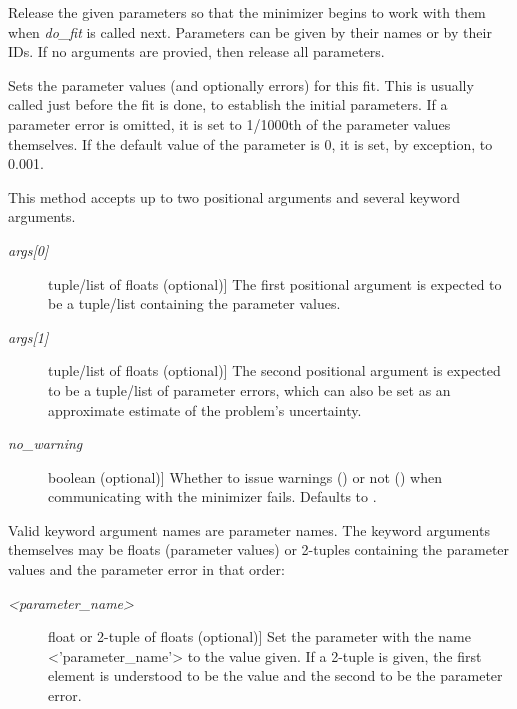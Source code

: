 \documentclass[a4paper,10pt,english]{sphinxmanual}
\begin{document}
\begin{fulllineitems}

\begin{fulllineitems}
\label{index:kafe.fit.Fit.release_parameters}
Release the given parameters so that the minimizer begins to work with
them when \emph{do\_fit} is called next. Parameters can be given by their
names or by their IDs. If no arguments are provied, then release all
parameters.

\end{fulllineitems}


\begin{fulllineitems}
\label{index:kafe.fit.Fit.set_parameters}
Sets the parameter values (and optionally errors) for this fit.
This is usually called just before the fit is done, to establish
the initial parameters. If a parameter error is omitted, it is
set to 1/1000th of the parameter values themselves. If the default
value of the parameter is 0, it is set, by exception, to 0.001.

This method accepts up to two positional arguments and several
keyword arguments.
\begin{description}
\item[{\emph{args{[}0{]}}}] \leavevmode{[}tuple/list of floats (optional){]}
The first positional argument is expected to be
a tuple/list containing the parameter values.

\item[{\emph{args{[}1{]}}}] \leavevmode{[}tuple/list of floats (optional){]}
The second positional argument is expected to be a
tuple/list of parameter errors, which can also be set as an
approximate estimate of the problem's uncertainty.

\item[{\emph{no\_warning}}] \leavevmode{[}boolean (optional){]}
Whether to issue warnings () or not () when
communicating with the minimizer fails. Defaults to .

\end{description}

Valid keyword argument names are parameter names. The keyword arguments
themselves may be floats (parameter values) or 2-tuples containing the
parameter values and the parameter error in that order:
\begin{description}
\item[{\emph{\textless{}parameter\_name\textgreater{}}}] \leavevmode{[}float or 2-tuple of floats (optional){]}
Set the parameter with the name \textless{}'parameter\_name'\textgreater{} to the value
given. If a 2-tuple is given, the first element is understood
to be the value and the second to be the parameter error.


\end{description}
\end{fulllineitems}
\end{fulllineitems}
\end{document}

